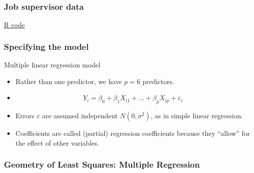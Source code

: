 \documentclass[handout]{beamer}
\begin{document}


   \begin{frame}
   \frametitle{Job supervisor data}
   \begin{center}
   \end{center}
   \href{http://stats191.stanford.edu/multiple.html#job-supervisor-example}{R code}
   \end{frame}


   \begin{frame} \frametitle{Specifying the model}

   \begin{block}
   {Multiple linear regression      model}

   \begin{itemize}

   \item Rather than one predictor, we have $p=6$ predictors.

   \item $$
   Y_i = \beta_0 + \beta_1 X_{i1} + \dots + \beta_p X_{ip} + \varepsilon_i
   $$

   \item Errors $\varepsilon$ are assumed independent $N(0,\sigma^2)$, as in simple linear regression.

   \item Coefficients are called (partial) regression coefficients because they ``allow'' for the effect of other variables.

   \end{itemize}
   \end{block}
   \end{frame}


   \begin{frame} \frametitle{Geometry of Least Squares: Multiple Regression}

   \end{frame}

\end{document}
